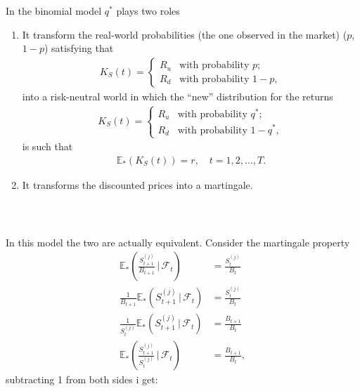 \documentclass{beamer}
\numberwithin{equation}{section}
\begin{document}
\begin{frame}\frametitle{{\normalsize \secname} \\ {\large \subsecname}}
    In the binomial model $q^*$ plays two roles
    \begin{enumerate}
        \item It transform the real-world probabilities (the one observed in the market) ($p$, $1-p$) satisfying that
        \begin{align}
            K_S(t) =
            \begin{cases}
                R_u & \text{with probability } p; \\
                R_d & \text{with probability } 1 - p,            
            \end{cases}
        \end{align}
        into a risk-neutral world in which the ``new'' distribution for the returns
        \begin{align}
            K_S(t) =
            \begin{cases}
                R_u & \text{with probability } q^*; \\
                R_d & \text{with probability } 1 - q^*,            
            \end{cases}
        \end{align}
        is such that
        \begin{align}
            \mathbb{E}_*(K_S(t)) = r, \quad t = 1,2,\ldots,T.
        \end{align}
        \item It transforms the discounted prices into a martingale.
    \end{enumerate}
\end{frame}

\begin{frame}\frametitle{{\normalsize \secname} \\ {\large \subsecname}}
    In this model the two are actually equivalent.
    Consider the martingale property
    \begin{align}
        \mathbb{E}_*\left( \frac{S_{t + 1}^{(j)}}{B_{t + 1}} \, \bigg| \, \mathscr{F}_t \right) &= \frac{S_{t}^{(j)}}{B_{t}} \\
        \frac{1}{B_{t + 1}}\mathbb{E}_*\left( S_{t + 1}^{(j)} \, \bigg| \, \mathscr{F}_t \right) &= \frac{S_{t}^{(j)}}{B_{t}} \\
        \frac{1}{S_{t}^{(j)}}\mathbb{E}_*\left( S_{t + 1}^{(j)} \, \bigg| \, \mathscr{F}_t \right) &= \frac{B_{t + 1}}{B_{t}} \\
        \mathbb{E}_*\left( \frac{S_{t + 1}^{(j)}}{S_{t}^{(j)}} \, \bigg| \, \mathscr{F}_t \right) &= \frac{B_{t + 1}}{B_{t}},
    \end{align}
    subtracting 1 from both sides i get:
\end{frame}
\end{document}
